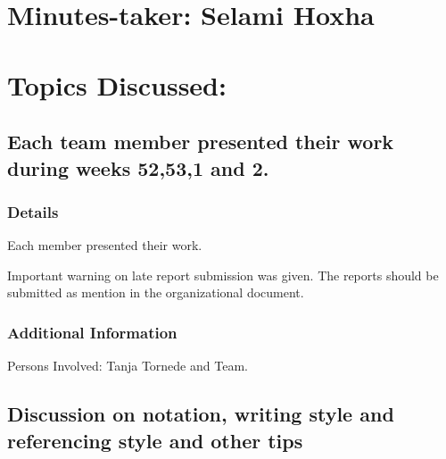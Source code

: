\documentclass[11pt]{meetingmins} %
\begin{document}
\maketitle

\section{Minutes-taker: Selami Hoxha}

\section{Topics Discussed:}

\subsection{Each team member presented their work during weeks 52,53,1 and 2.}
\subsubsection{Details}
\begin{hiddensubitems}
    \item
    Each member presented their work.
    \item
    Important warning on late report submission was given.
    The reports should be submitted as mention in the
    organizational document.
\end{hiddensubitems}

\subsubsection{Additional Information}
\begin{hiddensubitems}
    \item
    Persons Involved: Tanja Tornede and Team.
\end{hiddensubitems}

\subsection{Discussion on notation, writing style and referencing style and other tips}
\end{document}
